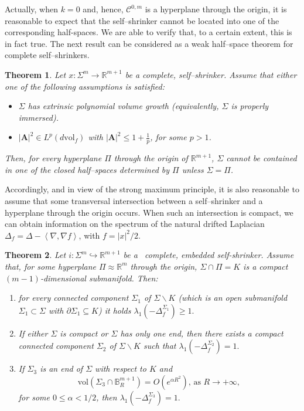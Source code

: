 \documentclass[11pt,leqno]{amsart}\usepackage{amsmath}
\newtheorem{theorem}{Theorem}
\numberwithin{equation}{section}
\begin{document}
Actually, when $k=0$ and, hence, $\mathcal{C}^{0,m}$ is a hyperplane through the origin, it is reasonable to expect that
the self--shrinker cannot be located into one of the corresponding half-spaces. We are able to verify that, to a certain extent, this is in fact true.
The next result can be considered as a weak half--space theorem for complete self--shrinkers.
\begin{theorem}
Let $x\colon \Sigma^{m}\rightarrow\mathbb{R}^{m+1}$ be
a complete, self--shrinker. Assume that either one of the following assumptions is satisfied:
\begin{itemize}
\item[(a)]$\Sigma$ has extrinsic polynomial volume growth (equivalently, $\Sigma$ is properly immersed).

\item[(b)] $\left\vert \mathbf{A}\right\vert ^2 \in L^{p} \left(
d\mathrm{vol}_{f}\right)$ with $\left\vert \mathbf{A}\right\vert ^{2}\leq 1+\frac{1}{p}$,
for some $p> 1$.
\end{itemize}
Then, for every hyperplane $\Pi$ through the origin of $\mathbb{R}^{m+1}$, $\Sigma$ cannot be contained
in one of the closed half--spaces determined by $\Pi$ unless $\Sigma=\Pi$.
\end{theorem}

Accordingly, and in view of the strong maximum principle, it is also reasonable to assume that some transversal intersection between a self--shrinker and a hyperplane through the origin occurs. When such an intersection is compact, we can obtain information on the spectrum of the natural drifted Laplacian $\Delta_{f}=\Delta - \left \langle \nabla, \nabla f \right \rangle$, with $f=|x|^2/2$.

\begin{theorem}
Let $i:\Sigma^{m}\hookrightarrow\mathbb{R}^{m+1}$ be a \ complete, embedded
self-shrinker. Assume that, for some hyperplane $\Pi\approx\mathbb{R}^{m}$
through the origin, $\Sigma\cap\Pi=K$ is a compact $\left(  m-1\right)
$-dimensional submanifold. Then:

\begin{enumerate}
\item[(a)] for every connected component $\Sigma_{1}$ of $\Sigma\backslash K$
(which is an open submanifold $\Sigma_{1}\subset\Sigma$ with $\partial
\Sigma_{1}\subseteq K$) it holds $\lambda_{1}(  -\Delta_{f}^{\Sigma_{1}})  \geq1.$



\item[(b)] If either $\Sigma$ is compact or $\Sigma$ has only one end, then
there exists a compact connected component $\Sigma_{2}$ of $\Sigma\backslash
K$ such that $\lambda_{1}(  -\Delta_{f}^{\Sigma_{2}})  =1.$


\item[(c)] If $\Sigma_{3}$ is an end of $\Sigma$ with respect to $K$ and\[
\mathrm{vol}\left(  \Sigma_{3}\cap \mathbb{B}_{R}^{m+1}\right)
=O(  e^{\alpha R^{2}})  \text{, as }R\rightarrow+\infty,
\]
for some $0\leq\alpha<1/2$, then $\lambda_{1}(  -\Delta_{f}^{\Sigma_{3}})  =1.$

\end{enumerate}
\end{theorem}
\end{document}
